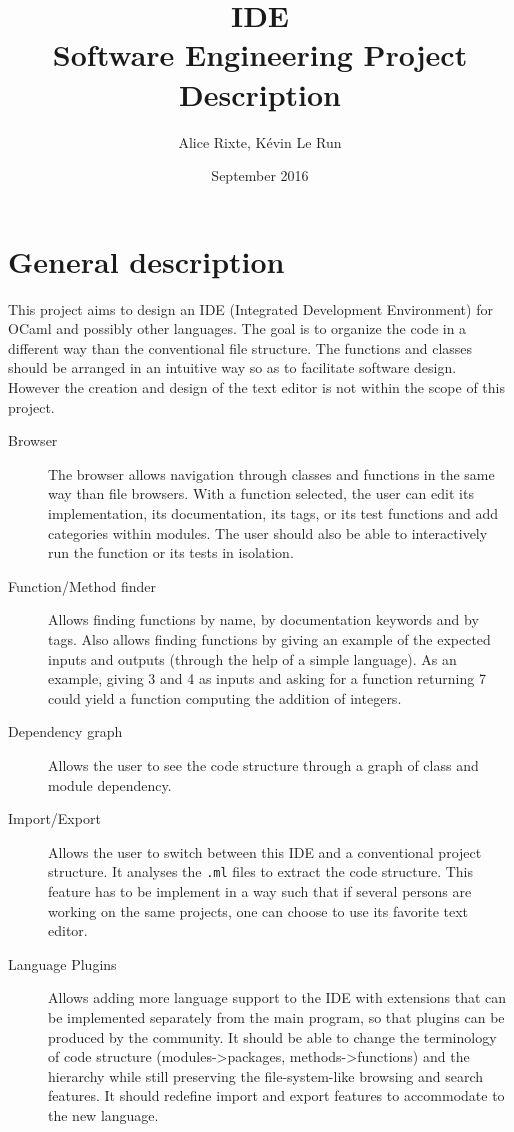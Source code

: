 \documentclass{article}
\title{IDE\\\Large{Software Engineering Project Description}}
\author{Alice Rixte, K\'evin Le Run}
\date{September 2016}
\begin{document}
\maketitle

\section{General description}

This project aims to design an IDE (Integrated Development Environment) for
OCaml and possibly other languages. The goal is to organize the code in a
different way than the conventional file structure. The functions and classes
should be arranged in an intuitive way so as to facilitate software design.
However the creation and design of the text editor is not within the scope of
this project.

\begin{description}

    \item [Browser] The browser allows navigation through classes and functions
        in the same way than file browsers. With a function selected, the user
        can edit its implementation, its documentation, its tags, or its test
        functions and add categories within modules.  The user should also be
        able to interactively run the function or its tests in isolation.

    \item [Function/Method finder] Allows finding functions by name, by
        documentation keywords and by tags. Also allows finding functions by
        giving an example of the expected inputs and outputs (through the help
        of a simple language). As an example, giving 3 and 4 as inputs and
        asking for a function returning 7 could yield a function computing the
        addition of integers.

    \item [Dependency graph] Allows the user to see the code structure through
        a graph of class and module dependency.

    \item [Import/Export] Allows the user to switch between this IDE and a
        conventional project structure. It analyses the \texttt{.ml} files to
        extract the code structure. This feature has to be implement in a 
        way such that if several persons are working on the same projects,
        one can choose to use its favorite text editor.

    \item [Language Plugins] Allows adding more language support to the IDE
        with extensions that can be implemented separately from the main
        program, so that plugins can be produced by the community. It should be
        able to change the terminology of code structure (modules->packages,
        methods->functions) and the hierarchy while still preserving the
        file-system-like browsing and search features. It should redefine
        import and export features to accommodate to the new language.

\end{description}
\end{document}
